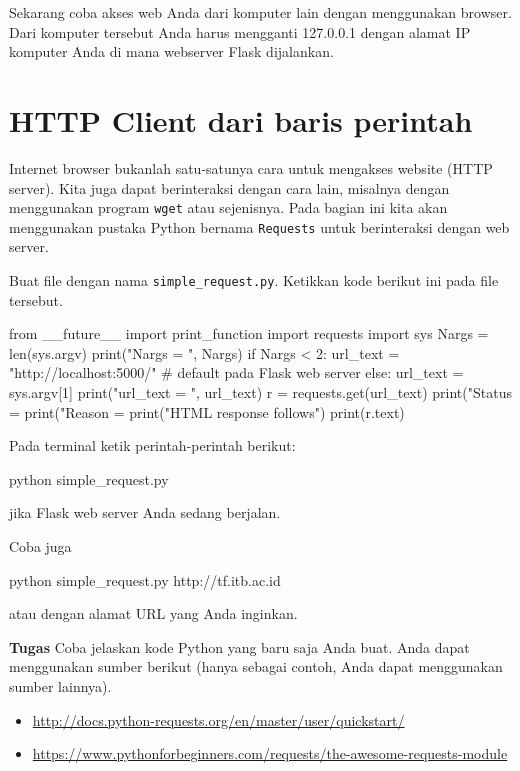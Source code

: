 \documentclass[a4paper,11pt]{extarticle}
\begin{document}
Sekarang coba akses web Anda dari komputer lain dengan menggunakan browser.
Dari komputer tersebut Anda harus mengganti 127.0.0.1 dengan alamat IP komputer
Anda di mana webserver Flask dijalankan.

\section{HTTP Client dari baris perintah}

Internet browser bukanlah satu-satunya cara untuk mengakses website (HTTP server).
Kita juga dapat berinteraksi dengan cara lain, misalnya dengan menggunakan program
\texttt{wget} atau sejenisnya. Pada bagian ini kita akan menggunakan pustaka Python
bernama \texttt{Requests} untuk berinteraksi dengan web server.

Buat file dengan nama \texttt{simple\_request.py}. Ketikkan kode berikut ini pada
file tersebut.
\begin{pythoncode}
from __future__ import print_function
import requests
import sys
Nargs = len(sys.argv)
print("Nargs = ", Nargs)
if Nargs < 2:
    url_text = "http://localhost:5000/"  # default pada Flask web server
else:
    url_text = sys.argv[1]
print("url_text = ", url_text)
r = requests.get(url_text)
print("Status = %
print("Reason = %
print("HTML response follows\n\n")
print(r.text)
\end{pythoncode}

Pada terminal ketik perintah-perintah berikut:
\begin{textcode}
python simple_request.py
\end{textcode}
jika Flask web server Anda sedang berjalan.

Coba juga
\begin{textcode}
python simple_request.py http://tf.itb.ac.id
\end{textcode}
atau dengan alamat URL yang Anda inginkan.

\textbf{Tugas} Coba jelaskan kode Python yang baru saja Anda buat.
Anda dapat menggunakan sumber berikut (hanya sebagai contoh, Anda dapat menggunakan
sumber lainnya).
\begin{itemize}
\item \url{http://docs.python-requests.org/en/master/user/quickstart/}
\item \url{https://www.pythonforbeginners.com/requests/the-awesome-requests-module}
\end{itemize}
\end{document}

